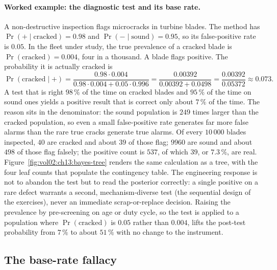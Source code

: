 \paragraph{Worked example: the diagnostic test and its base rate.}
A non-destructive inspection flags microcracks in turbine blades.
The method has  $\Pr(+ \mid \text{cracked}) =
0.98$ and  $\Pr(- \mid \text{sound}) = 0.95$,
so its false-positive rate is $0.05$. In the fleet under study, the
true prevalence of a cracked blade is $\Pr(\text{cracked}) = 0.004$,
four in a thousand. A blade flags positive. The probability it is
actually cracked is
\[
\Pr(\text{cracked} \mid +)
= \frac{0.98 \cdot 0.004}
{0.98 \cdot 0.004 + 0.05 \cdot 0.996}
= \frac{0.00392}{0.00392 + 0.0498}
= \frac{0.00392}{0.05372} \approx 0.073.
\]
A test that is right $98\,\%$ of the time on cracked blades and
$95\,\%$ of the time on sound ones yields a positive result that is
correct only about $7\,\%$ of the time. The reason sits in the
denominator: the sound population is $249$ times larger than the
cracked population, so even a small false-positive rate generates
far more false alarms than the rare true cracks generate true
alarms. Of every $10\,000$ blades inspected, $40$ are cracked and
about $39$ of those flag; $9960$ are sound and about $498$ of those
flag falsely; the positive count is $537$, of which $39$, or
$7.3\,\%$, are real. Figure~\ref{fig:vol02:ch13:bayes-tree} renders
the same calculation as a tree, with the four leaf counts that
populate the contingency table. The engineering response is not to
abandon the test but to read the posterior correctly: a single
positive on a rare defect warrants a second, mechanism-diverse test
(the sequential design of the exercises), never an immediate
scrap-or-replace decision. Raising the prevalence by pre-screening
on age or duty cycle, so the test is applied to a population where
$\Pr(\text{cracked})$ is $0.05$ rather than $0.004$, lifts the
post-test probability from $7\,\%$ to about $51\,\%$ with no change
to the instrument.



\subsection{The base-rate fallacy}

